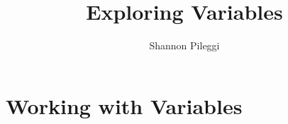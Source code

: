 





\title[Unit 1 Deck 2]{Exploring Variables}
\author[Pileggi]{Shannon Pileggi}


\date{}




\begin{frame}
\titlepage
\end{frame}


\section[Working with Variables]{Working with Variables}
\begin{frame}
\end{frame}

